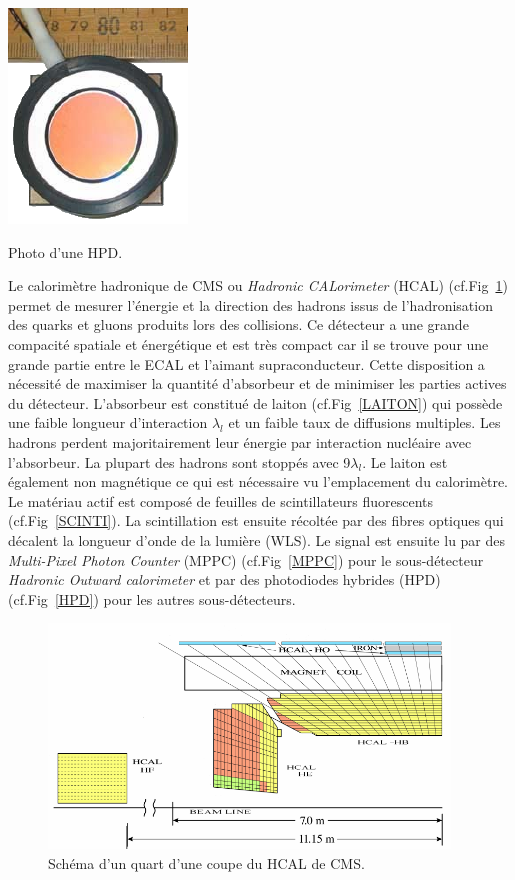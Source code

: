 \marginpar
{
	\centering
	\includegraphics[width=\marginparwidth]{CMS/HPD.png}
	\captionsetup{type=figure}\caption{Photo d'une HPD.}
	\label{HPD}
}
Le calorimètre hadronique de CMS ou \textit{Hadronic CALorimeter} (HCAL) (cf.Fig~\ref{HCAL}) permet de mesurer l'énergie et la direction des hadrons issus de l'hadronisation des quarks et gluons produits lors des collisions. Ce détecteur a une grande compacité spatiale et énergétique et est très compact car il se trouve pour une grande partie entre le ECAL et l'aimant supraconducteur. Cette disposition a nécessité de maximiser la quantité d'absorbeur et de minimiser les parties actives du détecteur. L'absorbeur est constitué de laiton (cf.Fig~\ref{LAITON}) qui possède une faible longueur d'interaction $\lambda_{l}$ et un faible taux de diffusions multiples. Les hadrons perdent majoritairement leur énergie par interaction nucléaire avec l'absorbeur. La plupart des hadrons sont stoppés avec \num{9}$\lambda_{l}$. Le laiton est également non magnétique ce qui est nécessaire vu l'emplacement du calorimètre. Le matériau actif est composé de feuilles de scintillateurs fluorescents (cf.Fig~\ref{SCINTI}). La scintillation est ensuite récoltée par des fibres optiques qui décalent la longueur d'onde de la lumière (WLS). Le signal est ensuite lu par des \textit{Multi-Pixel Photon Counter} (MPPC) (cf.Fig~\ref{MPPC}) pour le sous-détecteur \textit{Hadronic Outward calorimeter} et par des photodiodes hybrides (HPD) (cf.Fig~\ref{HPD}) pour les autres sous-détecteurs.
\begin{figure}[ht!]
	\centering
	\includegraphics[width=0.95\textwidth]{CMS/HCALSCHEME.png}
	\captionsetup{type=figure}\caption{Schéma d'un quart d'une coupe du HCAL de CMS.}
	\label{HCAL}
\end{figure}

